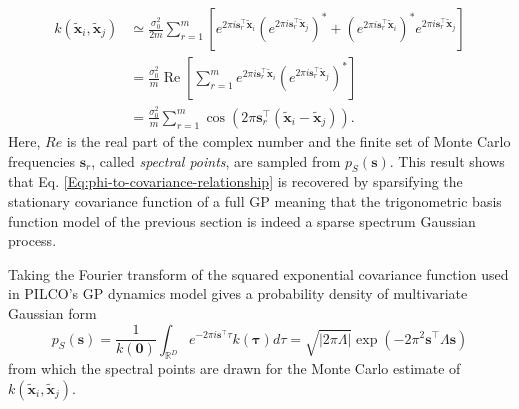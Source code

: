 \begin{equation}
    \begin{aligned} 
    k\left(\tilde{\mathbf{x}}_{i}, \tilde{\mathbf{x}}_{j}\right) 
    & \simeq \frac{\sigma_{0}^{2}}{2 m} \sum_{r=1}^{m}\left[e^{2 \pi i \mathbf{s}_{r}^{\top} \tilde{\mathbf{x}}_{i}}\left(e^{2 \pi i \mathbf{s}_{r}^{\top} \tilde{\mathbf{x}}_{j}}\right)^{*}+\left(e^{2 \pi i \mathbf{s}_{r}^{\top} \tilde{\mathbf{x}}_{i}}\right)^{*} e^{2 \pi i \mathbf{s}_{r}^{\top} \tilde{\mathbf{x}}_{j}}\right] \\ &=\frac{\sigma_{0}^{2}}{m} \operatorname{Re}\left[\sum_{r=1}^{m} e^{2 \pi i \mathbf{s}_{r}^{\top} \tilde{\mathbf{x}}_{i}}\left(e^{2 \pi i \mathbf{s}_{r}^{\top} \tilde{\mathbf{x}}_{j}}\right)^{*}\right] \\
    &=\frac{\sigma_{0}^{2}}{m} \sum_{r=1}^{m} \cos \left(2 \pi \mathbf{s}_{r}^{\top}\left(\tilde{\mathbf{x}}_{i}-\tilde{\mathbf{x}}_{j}\right)\right).
    \end{aligned}
\end{equation}
Here, $Re$ is the real part of the complex number and the finite set of Monte Carlo frequencies $\mathbf{s}_{r}$, called \textit{spectral points}, are sampled from $p_{S}(\mathbf{s})$. This result shows that Eq. \ref{Eq:phi-to-covariance-relationship} is recovered by sparsifying the stationary covariance function of a full GP meaning that the trigonometric basis function model of the previous section is indeed a sparse spectrum Gaussian process. 

Taking the Fourier transform of the squared exponential covariance function used in PILCO's GP dynamics model gives a probability density of multivariate Gaussian form
\begin{equation}
    p_{S}(\mathbf{s})=\frac{1}{k(\mathbf{0})} \int_{\mathbb{R}^{D}} e^{-2 \pi i \mathbf{s}^{\top} \tau} k(\mathbf{\tau}) d \tau=\sqrt{|2 \pi \Lambda|} \exp \left(-2 \pi^{2} \mathbf{s}^{\top} \Lambda \mathbf{s}\right)
    \label{Eq:Gaussian-spectral-points-sample}
\end{equation}
from which the spectral points are drawn for the Monte Carlo estimate of $k(\tilde{\mathbf{x}}_{i},\tilde{\mathbf{x}}_{j})$. 

